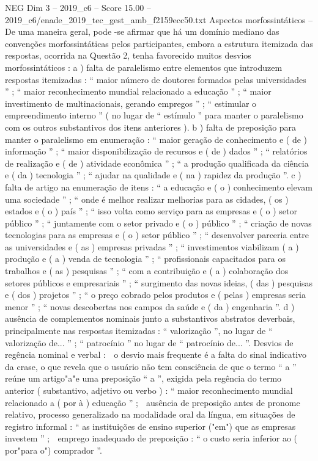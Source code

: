 \begin{textsample}{NEG Dim 3 – 2019\_c6 – Score 15.00 – 2019\_c6/enade\_2019\_tec\_gest\_amb\_f2159ecc50.txt}
Aspectos morfossintáticos – De uma maneira geral, pode -se afirmar que há um domínio mediano das convenções morfossintáticas pelos participantes, embora a estrutura itemizada das respostas, ocorrida na Questão 2, tenha favorecido muitos desvios morfossintáticos : a ) falta de paralelismo entre elementos que introduzem respostas itemizadas : “ maior número de doutores formados pelas universidades ” ; “ maior reconhecimento mundial relacionado a educação ” ; “ maior investimento de multinacionais, gerando empregos ” ; “ estimular o empreendimento interno ” ( no lugar de “ estímulo ” para manter o paralelismo com os outros substantivos dos itens anteriores ). b ) falta de preposição para manter o paralelismo em enumeração : “ maior geração de conhecimento e ( de ) informação ” ; “ maior disponibilização de recursos e ( de ) dados ” ; “ relatórios de realização e ( de ) atividade econômica ” ; “ a produção qualificada da ciência e ( da ) tecnologia ” ; “ ajudar na qualidade e ( na ) rapidez da produção ”. c ) falta de artigo na enumeração de itens : “ a educação e ( o ) conhecimento elevam uma sociedade ” ; “ onde é melhor realizar melhorias para as cidades, ( os ) estados e ( o ) país ” ; “ isso volta como serviço para as empresas e ( o ) setor público ” ; “ juntamente com o setor privado e ( o ) público ” ; “ criação de novas tecnologias para as empresas e ( o ) setor público ” ; “ desenvolver parceria entre as universidades e ( as ) empresas privadas ” ; “ investimentos viabilizam ( a ) produção e ( a ) venda de tecnologia ” ; “ profissionais capacitados para os trabalhos e ( as ) pesquisas ” ; “ com a contribuição e ( a ) colaboração dos setores públicos e empresariais ” ; “ surgimento das novas ideias, ( das ) pesquisas e ( dos ) projetos ” ; “ o preço cobrado pelos produtos e ( pelas ) empresas seria menor ” ; “ novas descobertas nos campos da saúde e ( da ) engenharia ”. d ) ausência de complementos nominais junto a substantivos abstratos deverbais, principalmente nas respostas itemizadas : “ valorização ”, no lugar de “ valorização de... ” ; “ patrocínio ” no lugar de “ patrocínio de... ”.
Desvios de regência nominal e verbal :  o desvio mais frequente é a falta do sinal indicativo da crase, o que revela que o usuário não tem consciência de que o termo “ a ” reúne um artigo"a"e uma preposição “ a ”, exigida pela regência do termo anterior ( substantivo, adjetivo ou verbo ) : “ maior reconhecimento mundial relacionado a ( por à ) educação ” ;  ausência de preposição antes de pronome relativo, processo generalizado na modalidade oral da língua, em situações de registro informal : “ as instituições de ensino superior ("em") que as empresas investem ” ;  emprego inadequado de preposição : “ o custo seria inferior ao ( por"para o") comprador ”.

\end{textsample}
